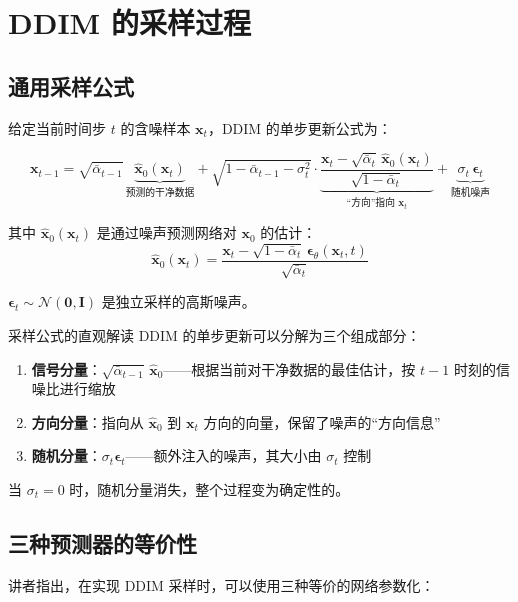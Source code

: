 \section{DDIM 的采样过程}

\subsection{通用采样公式}

给定当前时间步 $t$ 的含噪样本 $\mathbf{x}_t$，DDIM 的单步更新公式为：

$$
\mathbf{x}_{t-1} = \sqrt{\bar{\alpha}_{t-1}}\,\underbrace{\hat{\mathbf{x}}_0(\mathbf{x}_t)}_{\text{预测的干净数据}} + \sqrt{1-\bar{\alpha}_{t-1}-\sigma_t^2}\cdot\underbrace{\frac{\mathbf{x}_t - \sqrt{\bar{\alpha}_t}\,\hat{\mathbf{x}}_0(\mathbf{x}_t)}{\sqrt{1-\bar{\alpha}_t}}}_{\text{``方向''指向 } \mathbf{x}_t} + \underbrace{\sigma_t\,\boldsymbol{\epsilon}_t}_{\text{随机噪声}}
$$

其中 $\hat{\mathbf{x}}_0(\mathbf{x}_t)$ 是通过噪声预测网络对 $\mathbf{x}_0$ 的估计：
$$
\hat{\mathbf{x}}_0(\mathbf{x}_t) = \frac{\mathbf{x}_t - \sqrt{1-\bar{\alpha}_t}\,\boldsymbol{\epsilon}_\theta(\mathbf{x}_t, t)}{\sqrt{\bar{\alpha}_t}}
$$

$\boldsymbol{\epsilon}_t \sim \mathcal{N}(\mathbf{0}, \mathbf{I})$ 是独立采样的高斯噪声。

\begin{importantbox}{采样公式的直观解读}
DDIM 的单步更新可以分解为三个组成部分：
\begin{enumerate}
    \item \textbf{信号分量}：$\sqrt{\bar{\alpha}_{t-1}}\,\hat{\mathbf{x}}_0$——根据当前对干净数据的最佳估计，按 $t-1$ 时刻的信噪比进行缩放
    \item \textbf{方向分量}：指向从 $\hat{\mathbf{x}}_0$ 到 $\mathbf{x}_t$ 方向的向量，保留了噪声的``方向信息''
    \item \textbf{随机分量}：$\sigma_t \boldsymbol{\epsilon}_t$——额外注入的噪声，其大小由 $\sigma_t$ 控制
\end{enumerate}
当 $\sigma_t=0$ 时，随机分量消失，整个过程变为确定性的。
\end{importantbox}

\subsection{三种预测器的等价性}

讲者指出，在实现 DDIM 采样时，可以使用三种等价的网络参数化：

